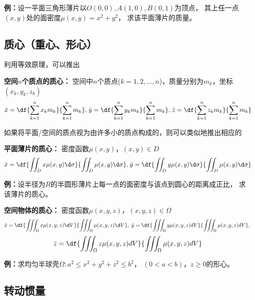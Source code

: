 {\bf 例：}设一平面三角形薄片以$O(0,0),A(1,0),B(0,1)$为顶点，
其上任一点$(x,y)$处的面密度$\mu(x,y)=x^2+y^2$，
求该平面薄片的质量。

\subsection{质心（重心、形心）}

利用等效原理，可以推出
\begin{thx}
	{\bf 空间$n$个质点的质心：}
	空间中$n$个质点($k=1,2,\ldots,n$)，质量分别为$m_k$，坐标$(x_k,y_k,z_k)$
	$${\bar{x}=\df{\sum\limits_{k=1}^nx_km_k}{\sum\limits_{k=1}^nm_k},}\;
	{\bar{y}=\df{\sum\limits_{k=1}^ny_km_k}{\sum\limits_{k=1}^nm_k},}\; 
	{\bar{z}=\df{\sum\limits_{k=1}^nz_km_k}{\sum\limits_{k=1}^nm_k}}$$
\end{thx}
如果将平面/空间的质点视为由许多小的质点构成的，则可以类似地推出相应的
\begin{thx}
	{\bf 平面薄片的质心：} 密度函数$\mu(x,y)$，$(x,y)\in D$
	$${\bar{x}=\df{\displaystyle\iint_Dx\mu(x,y)\d\sigma}
	{\displaystyle\iint_D\mu(x,y)\d\sigma},\;} 
	{\bar{y}=\df{\displaystyle\iint_Dy\mu(x,y)\d\sigma}
	{\displaystyle\iint_D\mu(x,y)\d\sigma}}$$
\end{thx}

{\bf 例：}设半径为$R$的半圆形薄片上每一点的面密度与该点到圆心的距离成正比，
求该薄片的质心。

\begin{thx}
	{\bf 空间物体的质心：} 密度函数$\mu(x,y,z)$，$(x,y,z)\in\Omega$
	$$\bar{x}=\df{\displaystyle\iiint_{\Omega}x\mu(x,y,z)\d V}
	{\displaystyle\iiint_{\Omega}\mu(x,y,z)\d V},\;
	{\bar{y}=\df{\displaystyle\iiint_{\Omega}y\mu(x,y,z)dV}
	{\displaystyle\iiint_{\Omega}\mu(x,y,z)dV},\;} $$
	$${\bar{z}=\df{\displaystyle\iiint_{\Omega}z\mu(x,y,z)dV}
	{\displaystyle\iiint_{\Omega}\mu(x,y,z)dV}}
	$$
\end{thx}

{\bf 例：}求均匀半球壳$\Omega:a^2\leq x^2+y^2+z^2\leq b^2$，
$(0<a<b)$，$z\geq 0$的形心。

\subsection{转动惯量}

